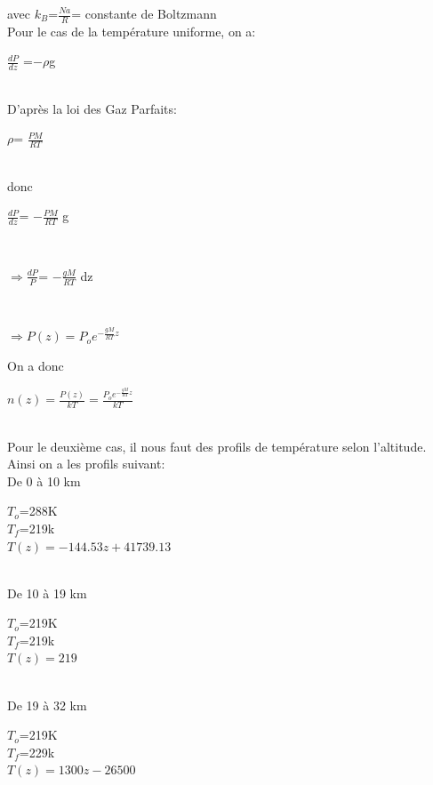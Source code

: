 \documentclass[a4paper, 12pt]{report} %
\begin{document}
avec $k_B$=$\frac{Na}{R}$= constante de Boltzmann\\

Pour le cas de la température uniforme, on a:

\begin{center}
    $\frac{dP}{dz}$ =$-\rho$g
\end{center}\\
D'après la loi des Gaz Parfaits: \\
\begin{center}
    $\rho$= $\frac{PM}{RT}$
\end{center}\\
donc \\
\begin{center}
    $\frac{dP}{dz}$= $-\frac{PM}{RT}$ g
\end{center}\\

\begin{center}
    $\Rightarrow\frac{dP}{P}$= $-\frac{gM}{RT}$ dz
\end{center}\\

\begin{center}
    $\Rightarrow P(z)= P_o e^{-\frac{gM}{RT} z }$
\end{center}

On a donc 
\begin{center}
	$n(z)=\frac{P(z)}{kT}= \frac{ P_o e^{-\frac{gM}{RT} z }}{kT}$
 \end{center}\\

Pour le deuxième cas, il nous faut des profils de température selon l'altitude.
Ainsi on a les profils suivant:\\
De 0 à 10 km \\
\begin{center}
    $T_o$=288K\\
    $T_f$=219k\\
    $T(z)=-144.53z+41739.13$
\end{center}\\

De 10 à 19 km \\
\begin{center}
    $T_o$=219K\\
    $T_f$=219k\\
    $T(z)=219$
\end{center}\\

De 19 à 32 km \\
\begin{center}
    $T_o$=219K\\
    $T_f$=229k\\
    $T(z)=1300z-26500$
\end{center}\\
\end{document}
